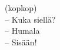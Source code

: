 
            (kopkop) \\
            – Kuka siellä? \\
            – Humala \\
            – Sisään! \\
